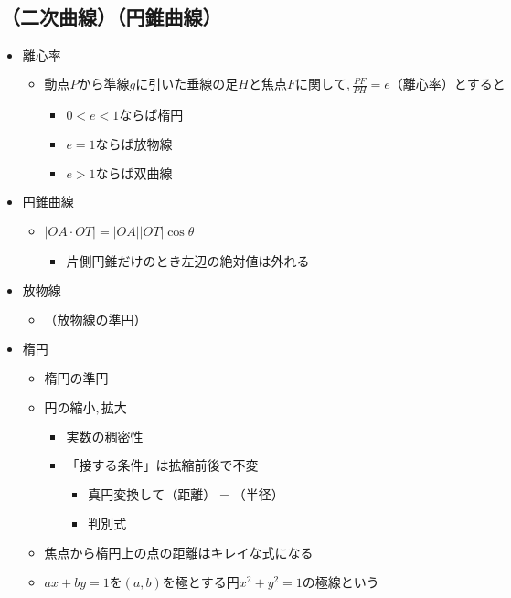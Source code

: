 \documentclass[dvipdfmx,uplatex]{jsarticle}
\begin{document}
\subsection{（二次曲線）（円錐曲線）}
\begin{itemize}
	\item $ 離心率$
	\begin{itemize}
		\item $ 動点Pから準線gに引いた垂線の足Hと焦点Fに関して,\frac{PF}{PH} = e（離心率）とすると$
		\begin{itemize}
			\item $ 0 < e < 1ならば楕円$
			\item $ e = 1 ならば放物線$
			\item $ e > 1 ならば双曲線  $
		\end{itemize}
	\end{itemize}
	\item $ 円錐曲線$
	\begin{itemize}
		\item $ |OA \cdot OT| = |OA||OT| \cos \theta$
		\begin{itemize}
			\item $ 片側円錐だけのとき左辺の絶対値は外れる$
		\end{itemize}
	\end{itemize}
	\item $ 放物線$
	\begin{itemize}
		\item $ （放物線の準円）$
	\end{itemize}
	\item $ 楕円$
	\begin{itemize}
		\item $ 楕円の準円$
		\item $ 円の縮小,拡大$
		\begin{itemize}
			\item $ 実数の稠密性$
			\item $ 「接する条件」は拡縮前後で不変$
			\begin{itemize}
				\item $ 真円変換して（距離） = （半径）$
				\item $ 判別式$
			\end{itemize}
		\end{itemize}
		\item $ 焦点から楕円上の点の距離はキレイな式になる$
		\item $ ax + by = 1を(a,b)を極とする円x^2+y^2=1の極線という$
		\begin{itemize}

\end{itemize}
\end{itemize}
\end{itemize}
\end{document}
